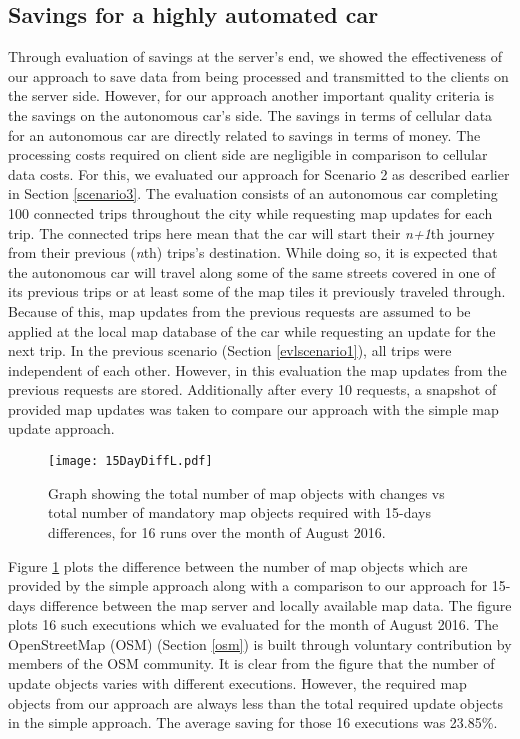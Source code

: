 \subsection{Savings for a highly automated car}
Through evaluation of savings at the server's end, we showed the effectiveness of our approach to save data from being processed and transmitted to the clients on the server side. However, for our approach another important quality criteria is the savings on the autonomous car's side. The savings in terms of cellular data for an autonomous car are directly related to savings in terms of money. The processing costs required on client side are negligible in comparison to cellular data costs. For this, we evaluated our approach for Scenario 2 as described earlier in Section \ref{scenario3}. The evaluation consists of an autonomous car completing 100 connected trips throughout the city while requesting map updates for each trip. The connected trips here mean that the car will start their \textit{n+1}th journey from their previous (\textit{n}th) trips's destination. While doing so, it is expected that the autonomous car will travel along some of the same streets covered in one of its previous trips or at least some of the map tiles it previously traveled through. Because of this, map updates from the previous requests are assumed to be applied at the local map database of the car while requesting an update for the next trip. In the previous scenario (Section \ref{evlscenario1}), all trips were independent of each other. However, in this evaluation the map updates from the previous requests are stored. Additionally after every 10 requests, a snapshot of provided map updates was taken to compare our approach with the simple map update approach. \\

\begin{figure}
\texttt{[image: 15DayDiffL.pdf]}
\caption{Graph showing the total number of map objects with changes vs total number of mandatory map objects required with 15-days differences, for 16 runs over the month of August 2016.}
\label{fg:16x15d}
\end{figure}

Figure \ref{fg:16x15d} plots the difference between the number of map objects which are provided by the simple approach along with a comparison to our approach for 15-days difference between the map server and locally available map data. The figure plots 16 such executions which we evaluated for the month of August 2016. The OpenStreetMap (OSM) (Section \ref{osm}) is built through voluntary contribution by members of the OSM community. It is clear from the figure that the number of update objects varies with different executions. However, the required map objects from our approach are always less than the total required update objects in the simple approach. The average saving for those 16 executions was 23.85\%. \\

